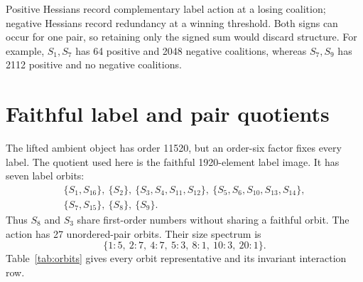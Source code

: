 \documentclass[10pt]{article}
\begin{document}
Positive Hessians record complementary label action at a losing coalition;
negative Hessians record redundancy at a winning threshold.  Both signs can
occur for one pair, so retaining only the signed sum would discard structure.
For example, $S_1,S_7$ has 64 positive and 2048 negative coalitions, whereas
$S_7,S_9$ has 2112 positive and no negative coalitions.

\section{Faithful label and pair quotients}
The lifted ambient object has order 11520, but an order-six factor fixes every
label.  The quotient used here is the faithful 1920-element label image.  It
has seven label orbits:
\[
\begin{gathered}
\{S_1,S_{16}\},\ \{S_2\},\ \{S_3,S_4,S_{11},S_{12}\},\
\{S_5,S_6,S_{10},S_{13},S_{14}\},\\
\{S_7,S_{15}\},\ \{S_8\},\ \{S_9\}.
\end{gathered}
\]
Thus $S_8$ and $S_3$ share first-order numbers without sharing a faithful
orbit.  The action has 27 unordered-pair orbits.  Their size spectrum is
\[
 \{1:5,\ 2:7,\ 4:7,\ 5:3,\ 8:1,\ 10:3,\ 20:1\}.
\]
Table~\ref{tab:orbits} gives every orbit representative and its invariant
interaction row.
\end{document}
